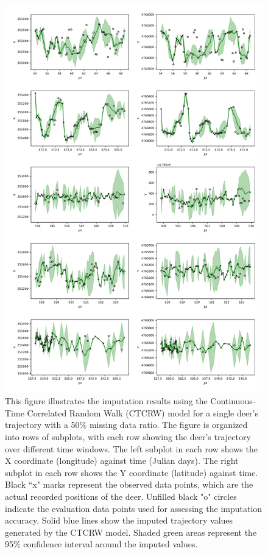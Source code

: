 \documentclass[11pt]{article}
\begin{document}
\begin{figure}[h]
  \centering
  \includegraphics[width=\textwidth]{../figure/50_5094_crawl} %
  \caption{This figure illustrates the imputation results using the Continuous-Time Correlated Random Walk (CTCRW) model for a single deer's trajectory with a 50\% missing data ratio. The figure is organized into rows of subplots, with each row showing the deer's trajectory over different time windows. The left subplot in each row shows the X coordinate (longitude) against time (Julian days). The right subplot in each row shows the Y coordinate (latitude) against time. Black ``x" marks represent the observed data points, which are the actual recorded positions of the deer. Unfilled black "o" circles indicate the evaluation data points used for assessing the imputation accuracy. Solid blue lines show the imputed trajectory values generated by the CTCRW model. Shaded green areas represent the 95\% confidence interval around the imputed values.}
  \label{fig: ctcrw_50} %
\end{figure}
\end{document}
